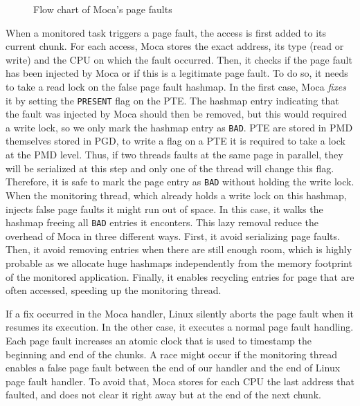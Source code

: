 \begin{figure}[htb]
    \centering
    
    \caption{Flow chart of Moca's page faults}
    \label{fig:fpf-flow}
\end{figure}

When a monitored task triggers a page fault, the access is first added to its current chunk.
For each access, \gls{Moca} stores the exact address, its type (read or write) and the CPU on which the fault occurred.
Then, it checks if the page fault has been injected by \gls{Moca} or if this is a legitimate page fault.
To do so, it needs to take a read lock on the false page fault hashmap.
In the first case, \gls{Moca} \emph{fixes} it by setting the \texttt{PRESENT} flag on the \gls{PTE}.
The hashmap entry indicating that the fault was injected by \gls{Moca} should then be removed, but this would required a write lock, so we only mark the hashmap entry as \texttt{BAD}.
\gls{PTE} are stored in \gls{PMD} themselves stored in \gls{PGD}, to write a flag on a \gls{PTE} it is required to take a lock at the \gls{PMD} level.
Thus, if two threads faults at the same page in parallel, they will be serialized at this step and only one of the thread will change this flag.
Therefore, it is safe to mark the page entry as \texttt{BAD} without holding the write lock.
When the monitoring thread, which already holds a write lock on this hashmap, injects false page faults it might run out of space.
In this case, it walks the hashmap freeing all \texttt{BAD} entries it enconters.
This lazy removal reduce the overhead of \gls{Moca} in three different ways.
First, it avoid serializing page faults.
Then, it avoid removing entries when there are still enough room, which is highly probable as we allocate huge hashmaps independently from the memory footprint of the monitored application.
Finally, it enables recycling entries for page that are often accessed, speeding up the monitoring thread.

If a fix occurred in the \gls{Moca} handler, Linux silently aborts the page fault when it resumes its execution.
In the other case, it executes a normal page fault handling.
Each page fault increases an atomic clock that is used to timestamp the beginning and end of the chunks.
A race might occur if the monitoring thread enables a false page fault between the end of our handler and the end of Linux page fault handler.
To avoid that, \gls{Moca} stores for each CPU the last address that faulted, and does not clear it right away but at the end of the next chunk.

